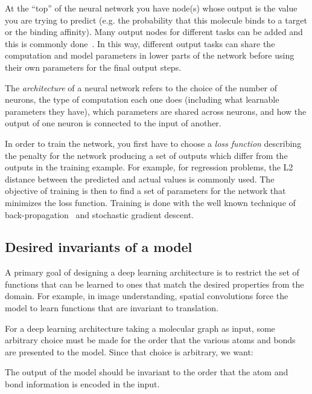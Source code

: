 At the ``top'' of the neural network you have node(s) whose output is the value
you are trying to predict (e.g. the probability that this molecule binds to a
target or the binding affinity). Many output nodes for
different tasks can be added and this is commonly
done~\citep{ma2015deep, ramsundar2015massively}. In this way, different
output tasks can share the computation and model parameters in lower parts of
the network before using their own parameters for the final output steps.

The \emph{architecture} of a neural network refers to the choice of the number of
neurons, the type of computation each one does (including what learnable
parameters they have), which parameters are shared across neurons, and how the
output of one neuron is connected to the input of another.

In order to train the network, you first have to choose a \emph{loss function}
describing the penalty for the network producing a set of outputs which differ
from the outputs in the training example. For example, for regression
problems, the L2 distance between the predicted and actual values is commonly
used. The objective of training is then to find a set of parameters for the
network that minimizes the loss function. Training is done with the well known
technique of back-propagation~\citep{rumelhart:backprop} and stochastic gradient
descent.

\subsection{Desired invariants of a model}\label{sec:architecture}

A primary goal of designing a deep learning architecture is to restrict the set
of functions that can be learned to ones that match the desired properties from
the domain. For example, in image understanding, spatial convolutions force the
model to learn functions that are invariant to translation.

For a deep learning architecture taking a molecular graph as input, some
arbitrary choice must be made for the order that the various atoms and bonds
are presented to the model. Since that choice is arbitrary, we want:
\begin{property}
  \label{prop:order_invariance}
  The output of the model should be invariant to the order that the atom and
  bond information is encoded in the input.
\end{property}

